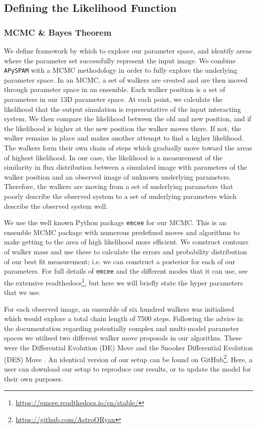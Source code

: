 \subsection{Defining the Likelihood Function}
\subsubsection{MCMC \& Bayes Theorem}
We define framework by which to explore our parameter space, and identify areas where the parameter set successfully represent the input image. We combine \texttt{APySPAM} with a MCMC methodology in order to fully explore the underlying parameter space. In an MCMC, a set of walkers are created and are then moved through parameter space in an ensemble. Each walker position is a set of parameters in our 13D parameter space. At each point, we calculate the likelihood that the output simulation is representative of the input interacting system. We then compare the likelihood between the old and new position, and if the likelihood is higher at the new position the walker moves there. If not, the walker remains in place and makes another attempt to find a higher likelihood. The walkers form their own chain of steps which gradually move toward the areas of highest likelihood. In our case, the likelihood is a measurement of the similarity in flux distribution between a simulated image with parameters of the walker position and an observed image of unknown underlying parameters. Therefore, the walkers are moving from a set of underlying parameters that poorly describe the observed system to a set of underlying parameters which describe the observed system well. 

We use the well known Python package \texttt{emcee} \citep{Foreman-Mackey_13} for our MCMC. This is an ensemble MCMC package with numerous predefined moves and algorithms to make getting to the area of high likelihood more efficient. We construct contours of walker mass and use these to calculate the errors and probability distribution of our best fit measurement; i.e. we can construct a posterior for each of our parameters. For full details of \texttt{emcee} and the different modes that it can use, see the extensive readthedocs\footnote{\url{https://emcee.readthedocs.io/en/stable/}}, but here we will briefly state the hyper parameters that we use. 

For each observed image, an ensemble of six hundred walkers was initialised which would explore a total chain length of 7500 steps. Following the advice in the documentation regarding potentially complex and multi-model parameter spaces we utilised two different walker move proposals in our algorithm. These were the Differential Evolution (DE) Move \citep{Nelson_14} and the Snooker Differential Evolution (DES) Move \citep{ter_Braak_08}. An identical version of our setup can be found on GitHub\footnote{\url{https://github.com/AstroORyan}}. Here, a user can download our setup to reproduce our results, or to update the model for their own purposes.

